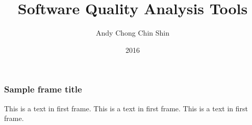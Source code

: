 \documentclass{beamer}
\title{Software Quality Analysis Tools}
\author{Andy Chong Chin Shin}
\institute{School of Computer Science and Engineering}
\date{2016}
\begin{document}
 
\frame{\titlepage}
 
\begin{frame}
\frametitle{Sample frame title}
This is a text in first frame. This is a text in first frame. This is a text in first frame.
\end{frame}
 
\end{document}
